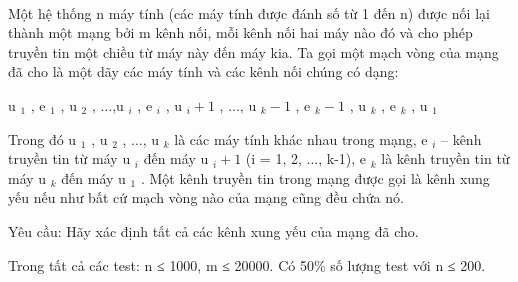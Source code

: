  

Một hệ thống n máy tính (các máy tính được đánh số từ 1 đến n) được nối lại thành một mạng bởi m kênh nối, mỗi kênh nối hai máy nào đó và cho phép truyền tin một chiều từ máy này đến máy kia. Ta gọi một mạch vòng của mạng đã cho là một dãy các máy tính và các kênh nối chúng có dạng:

u $_ 1 $ , e $_ 1 $ , u $_ 2 $ , ...,u $_ i $ , e $_ i $ , u $_ i+1 $ , ..., u $_ k-1 $ , e $_ k-1 $ , u $_ k $ , e $_ k $ , u $_ 1 $

Trong đó u $_ 1 $ , u $_ 2 $ , ..., u $_ k $ là các máy tính khác nhau trong mạng, e $_ i $ – kênh truyền tin từ máy u $_ i $ đến máy u $_ i+1 $ (i = 1, 2, ..., k-1), e $_ k $ là kênh truyền tin từ máy u $_ k $ đến máy u $_ 1 $ . Một kênh truyền tin trong mạng được gọi là kênh xung yếu nếu như bất cứ mạch vòng nào của mạng cũng đều chứa nó.

Yêu cầu: Hãy xác định tất cả các kênh xung yếu của mạng đã cho.

Trong tất cả các test: n ≤ 1000, m ≤ 20000. Có 50\% số lượng test với n ≤ 200.